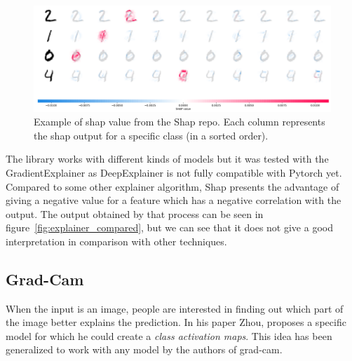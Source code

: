 \begin{figure}
 \centering
 \includegraphics[width=.9\linewidth]{figures/shap_mnist_image_plot.png}
 \captionsetup{width=.9\linewidth}
 \caption[ShapExample]{Example of shap value from the Shap repo\footnotemark{}. Each column represents the shap output for a specific class (in a sorted order).}
 \label{fig:shap_example}
\end{figure}

The library\cite{shap_lundberg2017unified} works with different kinds of models but it was tested with the GradientExplainer as DeepExplainer is not fully compatible with Pytorch yet. Compared to some other explainer algorithm, Shap presents the advantage of giving a negative value for a feature which has a negative correlation with the output. The output obtained by that process can be seen in figure~\ref{fig:explainer_compared}, but we can see that it does not give a good interpretation in comparison with other techniques.



\subsection{Grad-Cam}
When the input is an image, people are interested in finding out which part of the image better explains the prediction. In his paper\cite{zhou2015cnnlocalization} Zhou, proposes a specific model for which he could create a \textit{class activation maps}. This idea has been generalized to work with any model by the authors of grad-cam. 

